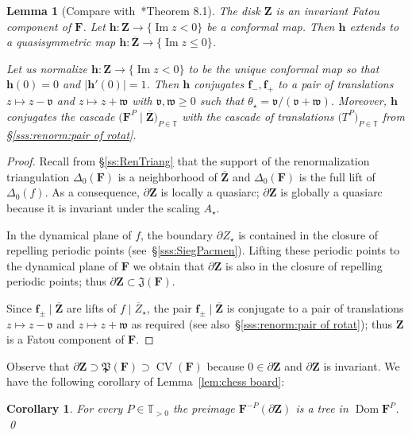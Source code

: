 \documentclass{amsart}
\newcommand{\Dom}{\operatorname {Dom}}
\newcommand{\1}{{\mathbb 1 }}
\renewcommand{\Im}{\operatorname {Im}}
\newcommand\PT{\mathbb{ T}}
\newcommand{\bDelta}{{\mathbb{\Delta}}}
\newcommand\Jul{{\mathfrak J}}
\newcommand\Post{{\mathfrak P}}
\newcommand{\bF}{{\mathbf F}}
\newcommand{\bZ}{{\mathbf Z}}
\newcommand{\bbf}{{\mathbf f}}
\newcommand{\bbh}{{\mathbf h}}
\newcommand{\str}{{\star}}
\newcommand{\vv}{\mathfrak{v}}
\newcommand{\ww}{\mathfrak{w}}
\newtheorem{cor}[thm]{Corollary}
\newtheorem{lem}[thm]{Lemma}
\theoremstyle{remark}
\numberwithin{equation}{section}
\theoremstyle{definition}
\newcommand{\CV}{{\operatorname{CV}}}
\theoremstyle{nonumberbreak}
\begin{document}
\begin{lem}[Compare with~\cite{McM2}*{Theorem 8.1}]
\label{lem:irr rot of bZ}
The disk $\bZ$ is an invariant Fatou component of $\bF$. Let $\bbh\colon  \bZ\to \{ \Im z< 0\}$ be a conformal map. Then $\bbh$ extends to a quasisymmetric map $\bbh\colon \overline \bZ\to \{ \Im z \le 0 \}$. 

Let us normalize $\bbh\colon  \bZ\to \{ \Im z< 0\}$ to be the unique conformal map so that $\bbh(0)=0$ and $|\bbh'(0)|=1$. Then $\bbh$ conjugates $\bbf_{-},\bbf_{+}$ to a pair of translations $z\mapsto z -\vv$ and $z\mapsto z+\ww$ with $\vv,\ww\ge0$ such that $\theta_\str=\vv/(\vv+\ww)$. Moreover, $\bbh$ conjugates the cascade $\big(\bF^P\mid \overline \bZ\big)_{P\in \PT}$ with the cascade of translations $\big(T^P\big)_{P\in \PT}$ from \S\ref{sss:renorm:pair of rotat}. 
\end{lem}
\begin{proof}
Recall from \S\ref{ss:RenTriang} that the support of the renormalization triangulation $\bDelta_0(\bF)$ is a neighborhood of $\overline \bZ$ and $\bDelta_0(\bF)$ is the full lift of $\bDelta_0(f)$. As a consequence, $\partial \bZ$ is locally a quasiarc; $\partial \bZ$ is globally a quasiarc  because it is invariant under the scaling $A_\str$.

In the dynamical plane of $f$, the boundary $\partial Z_\str$ is contained in the closure of repelling periodic points (see~\S\ref{sss:SiegPacmen}). Lifting these periodic points to the dynamical plane of $\bF$ we obtain that $\partial \bZ$ is also in the closure of repelling periodic points; thus $\partial \bZ\subset \Jul(\bF)$. 

Since $\bbf_\pm\mid \overline\bZ$ are lifts of $f\mid \overline Z_\str$, the pair $\bbf_\pm\mid \overline \bZ$ is conjugate to a pair of translations $z\mapsto z -\vv$ and $z\mapsto z+\ww$ as required (see also~\S\ref{sss:renorm:pair of rotat}); thus $\bZ$ is a Fatou component of $\bF$.   
\end{proof}



 Observe that $\partial \bZ\supset \Post(\bF) \supset\CV(\bF)$ because $0\in \partial \bZ$ and $\partial \bZ$ is invariant. We have the following corollary of Lemma~\ref{lem:chess board}: 
\begin{cor}
\label{cor:preimage:bZ:tree}
For every $P\in \PT_{>0}$ the preimage $\bF^{-P}(\partial \bZ)$ is a tree in $\Dom \bF^P$. \qed
\end{cor} 
 
\end{document}
